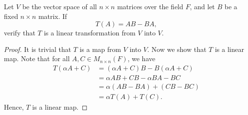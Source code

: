 \begin{problem}
    Let \(V\) be the vector space of all \(n \times n\) matrices over the field \(F\), and let \(B\) be a fixed \(n \times n\) matrix. If 
    \[
        T(A) = AB-BA,
    \]verify that \(T\) is a linear transformation from \(V\) into \(V\).   
\end{problem}
\begin{proof}
It is trivial that \(T\) is a map from \(V\) into \(V\). Now we show that \(T\) is a linear map. Note that for all \(A, C \in M_{n \times n}(F)\), we have
\begin{align*}
    T(\alpha A + C) &= (\alpha A + C)B - B(\alpha A + C) \\
    &= \alpha AB + CB - \alpha BA - BC \\
    &= \alpha (AB - BA) + (CB - BC) \\
    &= \alpha T(A) + T(C).
\end{align*}   
Hence, \(T\) is a linear map.
\end{proof}

